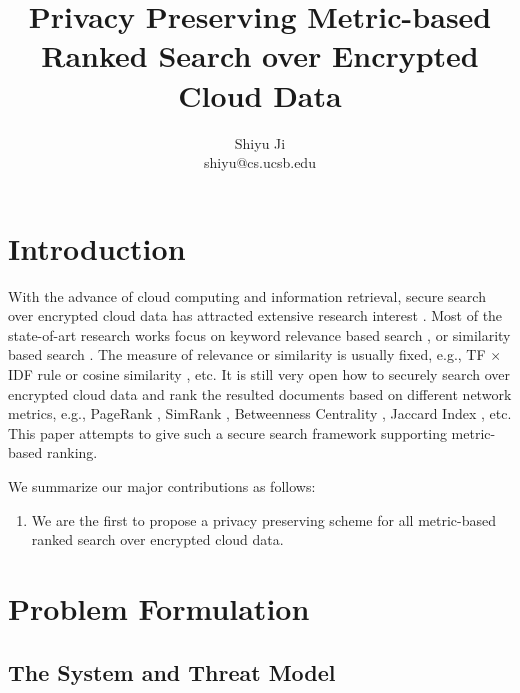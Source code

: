 \documentclass{IEEEtran}
\begin{document}
\title{\Large\bf Privacy Preserving Metric-based Ranked Search over Encrypted Cloud Data}
\author{Shiyu Ji\\ shiyu@cs.ucsb.edu}
\date{}
\maketitle

\newtheorem{definition}{Definition}
\theoremstyle{definition}
\newtheorem{theorem}{Theorem}
\theoremstyle{plain}
\newtheorem{lemma}{Lemma}
\theoremstyle{plain}
\newtheorem{corollary}{Corollary}
\theoremstyle{plain}

\section{Introduction}

With the advance of cloud computing and information retrieval, secure search over encrypted cloud data has attracted extensive research interest \cite{WC12,Cao14,Sun13,WYL14,SLH14,SLL15,LLD15,WSL15,Xia16}. Most of the state-of-art research works focus on keyword relevance based search \cite{WC12,WYL14,LLD15,SLL15,WSL15}, or similarity based search \cite{Cao14,Sun13,SLH14,Xia16}. The measure of relevance or similarity is usually fixed, e.g., TF $\times$ IDF rule \cite{WC12} or cosine similarity \cite{Cao14,Xia16}, etc. It is still very open how to securely search over encrypted cloud data and rank the resulted documents based on different network metrics, e.g., PageRank \cite{PR99}, SimRank \cite{JW02}, Betweenness Centrality \cite{Bran01}, Jaccard Index \cite{Jac89}, etc. This paper attempts to give such a secure search framework supporting metric-based ranking.

We summarize our major contributions as follows:
\begin{enumerate}
\item We are the first to propose a privacy preserving scheme for all metric-based ranked search over encrypted cloud data.
\end{enumerate}

\section{Problem Formulation}
\subsection{The System and Threat Model}
\end{document}
